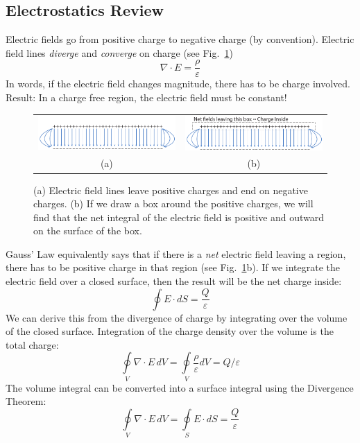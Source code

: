 \subsection{Electrostatics Review }
Electric fields go from positive charge to negative charge (by convention).   Electric field lines \textit{diverge} and \textit{converge} on charge (see Fig.~\ref{fig:mod2-2_ICtech_sld_11})
    \begin{equation} 
        \nabla \cdot E = \frac{\rho}{\varepsilon} 
    \end{equation}
In words, if the electric field changes magnitude, there has to be charge involved.
 Result: In a charge free region, the electric field must be constant!
\begin{figure}[tb]
\centering
\begin{tabular}{cc}
\includegraphics[width=.45\columnwidth]{charge_fields} &
\includegraphics[width=.45\columnwidth]{charge_fields_guass}\\
(a) & (b)\\
\end{tabular}
\caption{(a) Electric field lines leave positive charges and end on negative charges.  (b) If we draw a box around the positive charges, we will find that the net integral of the electric field is positive and outward on the surface of the box.}
\label{fig:mod2-2_ICtech_sld_11}
\end{figure}
Gauss’ Law equivalently says that if there is a \textit{net} electric field leaving a region, there has to be positive charge in that region (see Fig.~\ref{fig:mod2-2_ICtech_sld_11}b).   If we integrate the electric field over a closed surface, then the result will be the net charge inside:
\begin{equation}
	\oint {E \cdot dS = \frac{Q}{\varepsilon }} 
\end{equation}
We can derive this from the divergence of charge by integrating over the volume of the closed surface.  Integration of the charge density over the volume is the total charge:
    \begin{equation}
        \oint\limits_V {\nabla \cdot E\,dV =} \oint\limits_V {\frac{\rho}{\varepsilon}dV = Q/\varepsilon} 
    \end{equation}
The volume integral can be converted into a surface integral using the Divergence Theorem:
    \begin{equation} 
        \oint\limits_V {\nabla  \cdot E\,dV = } \oint\limits_S {E \cdot dS = } \frac{Q}{\varepsilon } 
    \end{equation}

